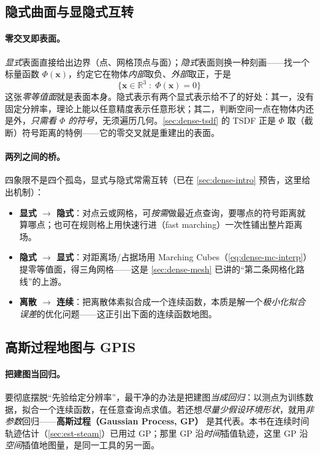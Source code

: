 \subsection{隐式曲面与显隐式互转}
\label{sec:dense-implicit-surface}

\paragraph{零交叉即表面。}
\emph{显式}表面直接给出边界（点、网格顶点与面）；\emph{隐式}表面则换一种刻画——找一个标量函数 $\Phi(\mathbf{x})$，约定它在物体\emph{内部}取负、\emph{外部}取正，于是
\begin{equation}
  \{\mathbf{x}\in\mathbb{R}^3 \;:\; \Phi(\mathbf{x})=0\}
  \label{eq:dense-implicit-def}
\end{equation}
这张\emph{零等值面}就是表面本身。隐式表示有两个显式表示给不了的好处：其一，没有固定分辨率，理论上能以任意精度表示任意形状；其二，判断空间一点在物体内还是外，\emph{只需看 $\Phi$ 的符号}，无须遍历几何。\cref{sec:dense-tsdf} 的 TSDF 正是 $\Phi$ 取（截断）符号距离的特例——它的零交叉就是重建出的表面。

\paragraph{两列之间的桥。}
四象限不是四个孤岛，显式与隐式常需互转（已在 \cref{sec:dense-intro} 预告，这里给出机制）：
\begin{itemize}
  \item \textbf{显式 $\to$ 隐式}：对点云或网格，可\emph{按需}做最近点查询，要哪点的符号距离就算哪点；也可在规则格上用快速行进（fast marching）一次性铺出整片距离场。
  \item \textbf{隐式 $\to$ 显式}：对距离场/占据场用 Marching Cubes（\cref{eq:dense-mc-interp}）提零等值面，得三角网格——这是 \cref{sec:dense-mesh} 已讲的“第二条网格化路线”的上游。
  \item \textbf{离散 $\to$ 连续}：把离散体素拟合成一个连续函数，本质是解一个\emph{极小化拟合误差}的优化问题——这正引出下面的连续函数地图。
\end{itemize}

\subsection{高斯过程地图与 GPIS}
\label{sec:dense-implicit-gp}

\paragraph{把建图当回归。}
要彻底摆脱“先验给定分辨率”，最干净的办法是把建图\emph{当成回归}：以测点为训练数据，拟合一个连续函数，在任意查询点求值。若还想\emph{尽量少假设环境形状}，就用\emph{非参数}回归——\textbf{高斯过程（Gaussian Process, GP）}\cite{rasmussen2006gp} 是其代表。本书在连续时间轨迹估计（\cref{sec:est-steam}）已用过 GP；那里 GP 沿\emph{时间}插值轨迹，这里 GP 沿\emph{空间}插值地图量，是同一工具的另一面。

